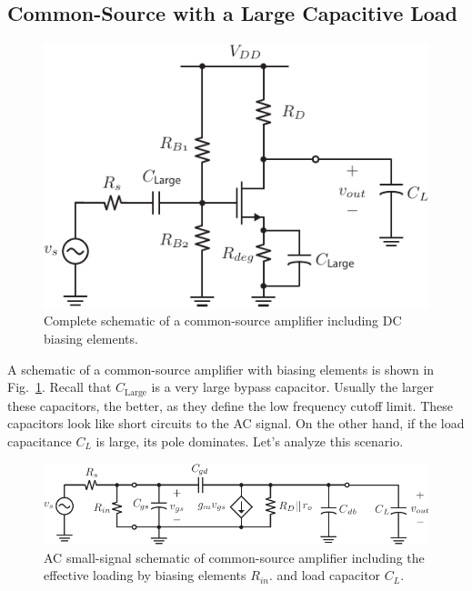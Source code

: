 
\subsection{Common-Source with a Large Capacitive Load}


\begin{figure}[tb]
\begin{center}
\includegraphics[scale=1]{6cs_dc}
\end{center}
\caption{Complete schematic of a common-source amplifier including DC biasing elements.} \label{fig:6cs_dc}
\end{figure}


A schematic of a common-source amplifier with biasing elements is shown in Fig.~\ref{fig:6cs_dc}. Recall that $C_{\text{Large}}$ is a very large bypass capacitor.  Usually the larger these capacitors, the better, as they define the low frequency cutoff limit.  These capacitors look like short circuits to the AC signal.  On the other hand, if the load capacitance $C_L$ is large, its pole dominates. Let's analyze this scenario.
 

\begin{figure}[tb]
\begin{center}
\includegraphics[scale=1]{7cs_cL_ss}
\end{center}
\caption{AC small-signal schematic of common-source amplifier including the effective loading by biasing elements $R_{in}$. and load capacitor $C_L$.} \label{fig:7cs_cL_ss}
\end{figure}

